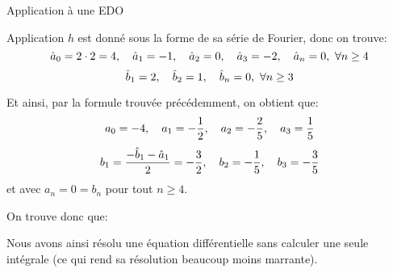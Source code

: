 \documentclass[a4paper]{article}
\begin{document}
\begin{parag}{Application à une EDO}
\begin{subparag}{Application}
        $h$ est donné sous la forme de sa série de Fourier, donc on trouve: 
        \[\hat{a}_0 = 2\cdot 2 = 4, \quad \hat{a}_1 = -1, \quad \hat{a}_2 = 0, \quad\hat{a}_3 = -2, \quad \hat{a}_n = 0, \ \forall n \geq4\]
        \[\hat{b}_1 = 2, \quad\hat{b}_2 = 1, \quad \hat{b}_n = 0, \ \forall n \geq 3\]

        Et ainsi, par la formule trouvée précédemment, on obtient que: 
        \[a_0 = -4, \quad a_1 = -\frac{1}{2}, \quad a_2 = -\frac{2}{5}, \quad a_3 = \frac{1}{5}\] 
        \[b_1 = \frac{-\hat{b}_1 - \hat{a}_1}{2} = -\frac{3}{2}, \quad b_2 = -\frac{1}{5}, \quad b_3 = -\frac{3}{5}\]
        et avec $a_n = 0 = b_n$ pour tout $n \geq 4$.

        On trouve donc que: 
        
        Nous avons ainsi résolu une équation différentielle sans calculer une seule intégrale (ce qui rend sa résolution beaucoup moins marrante).
    \end{subparag}
\end{parag}
\end{document}
